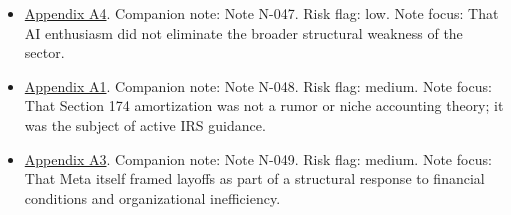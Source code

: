 \documentclass[
  american,
  11pt,
  letterpaper,
]{article}
\begin{document}
\begin{itemize}
  practical Section 174 fight directly implicated software development,
  not only laboratory research.
\item
  \hyperref[appendix-a4-ai-exuberance-masks-broad-weakness-in-tech-sector-say-investors]{Appendix
  A4}. Companion note: Note N-047. Risk flag: low. Note focus: That AI
  enthusiasm did not eliminate the broader structural weakness of the
  sector.
\item
  \hyperref[appendix-a1-notice-2023-63-guidance-on-section-174-and-specified-research-or-experimental-expenditures]{Appendix
  A1}. Companion note: Note N-048. Risk flag: medium. Note focus: That
  Section 174 amortization was not a rumor or niche accounting theory;
  it was the subject of active IRS guidance.
\item
  \hyperref[appendix-a3-mark-zuckerberg-s-message-to-meta-employees]{Appendix
  A3}. Companion note: Note N-049. Risk flag: medium. Note focus: That
  Meta itself framed layoffs as part of a structural response to
  financial conditions and organizational inefficiency.
\end{itemize}
\end{document}
